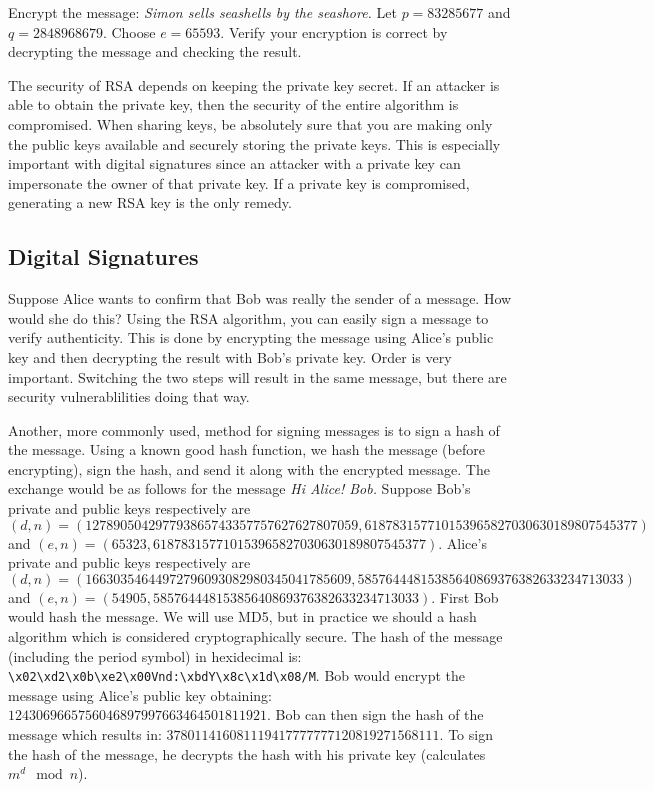 \begin{problem}
Encrypt the message: \emph{Simon sells seashells by the seashore.}
Let $p=83285677$ and $q=2848968679$.
Choose $e=65593$.
Verify your encryption is correct by decrypting the message and checking the result.
\end{problem}

\begin{warn}
The security of RSA depends on keeping the private key secret.  
If an attacker is able to obtain the private key, then the security of the entire algorithm is compromised.
When sharing keys, be absolutely sure that you are making only the public keys available and securely storing the private keys.
This is especially important with digital signatures since an attacker with a private key can impersonate the owner of that private key.
If a private key is compromised, generating a new RSA key is the only remedy.
\end{warn}


\subsection*{Digital Signatures}
Suppose Alice wants to confirm that Bob was really the sender of a message.
How would she do this?
Using the RSA algorithm, you can easily sign a message to verify authenticity.
This is done by encrypting the message using Alice's public key and then decrypting the result with Bob's private key.
Order is very important.  
Switching the two steps will result in the same message, but there are security vulnerablilities doing that way.

Another, more commonly used, method for signing messages is to sign a hash of the message.
Using a known good hash function, we hash the message (before encrypting), sign the hash, and send it along with the encrypted message.
The exchange would be as follows for the message \emph{Hi Alice! Bob.}
Suppose Bob's private and public keys respectively are $(d, n) = (127890504297793865743357757627627807059, 618783157710153965827030630189807545377)$ and $(e, n)=(65323, 618783157710153965827030630189807545377)$.
Alice's private and public keys respectively are $(d,n)=(16630354644972796093082980345041785609, 58576444815385640869376382633234713033)$ and $(e,n)=(54905, 58576444815385640869376382633234713033)$.
First Bob would hash the message.  We will use MD5, but in practice we should a hash algorithm which is considered cryptographically secure.
The hash of the message (including the period symbol) in hexidecimal is: \verb|\x02\xd2\x0b\xe2\x00Vnd:\xbdY\x8c\x1d\x08/M|.
Bob would encrypt the message using Alice's public key obtaining: $1243069665756046897997663464501811921$.
Bob can then sign the hash of the message which results in: $378011416081119417777777120819271568111$.
To sign the hash of the message, he decrypts the hash with his private key (calculates $m^{d} \mod n$).

